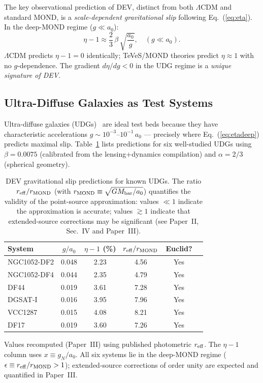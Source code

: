 \documentclass[aps,prd,twocolumn,showpacs,superscriptaddress]{revtex4-2}
\newcommand{\aO}{a_0}
\newcommand{\LCDM}{$\Lambda$CDM}
\begin{document}
The key observational prediction of DEV, distinct from both
\LCDM{} and standard MOND, is a \emph{scale-dependent gravitational slip}
following Eq.~(\ref{eq:eta}).
In the deep-MOND regime ($g \ll \aO$):
\begin{equation}
  \eta - 1 \approx \frac{2}{3}\,\beta\,\sqrt{\frac{\aO}{g}},
  \quad (g \ll \aO).
  \label{eq:etadeep}
\end{equation}
\LCDM{} predicts $\eta - 1 = 0$ identically;
TeVeS/MOND theories predict $\eta \approx 1$ with no $g$-dependence.
The gradient $d\eta/dg < 0$ in the UDG regime is a
\emph{unique signature of DEV}.

\subsection{Ultra-Diffuse Galaxies as Test Systems}

Ultra-diffuse galaxies (UDGs)~\cite{vanDokkum2015} are ideal test beds
because they have characteristic accelerations
$g \sim 10^{-3}$--$10^{-1}\,\aO$ —
precisely where Eq.~(\ref{eq:etadeep}) predicts maximal slip.
Table~\ref{tab:udg} lists predictions for six well-studied UDGs using
$\beta = 0.0075$ (calibrated from the lensing+dynamics compilation)
and $\alpha = 2/3$ (spherical geometry).

\begin{table}[h]
\caption{DEV gravitational slip predictions for known UDGs.
The ratio $r_{\rm eff}/r_{\rm MOND}$ (with
$r_{\rm MOND}\equiv\sqrt{GM_{\rm bar}/\aO}$) quantifies the validity
of the point-source approximation: values $\ll 1$ indicate the
approximation is accurate; values $\gtrsim 1$ indicate that
extended-source corrections may be significant (see Paper~II,
Sec.~IV and Paper~III).}
\label{tab:udg}
\begin{ruledtabular}
\begin{tabular}{lccccc}
System & $g/\aO$ & $\eta-1$ (\%) & $r_{\rm eff}/r_{\rm MOND}$ & Euclid? \\
\hline
NGC1052-DF2 & 0.048 & 2.23 & 4.56 & Yes \\
NGC1052-DF4 & 0.044 & 2.35 & 4.79 & Yes \\
DF44        & 0.019 & 3.61 & 7.28 & Yes \\
DGSAT-I     & 0.016 & 3.95 & 7.96 & Yes \\
VCC1287     & 0.015 & 4.08 & 8.21 & Yes \\
DF17        & 0.019 & 3.60 & 7.26 & Yes \\
\end{tabular}
\end{ruledtabular}
{\small Values recomputed (Paper~III) using published
photometric $r_{\rm eff}$. The $\eta-1$ column uses
$x \equiv g_N/\aO$. All six systems lie in the deep-MOND
regime ($\epsilon \equiv r_{\rm eff}/r_{\rm MOND}>1$);
extended-source corrections of order unity are expected and
quantified in Paper~III.}
\end{table}
\end{document}
